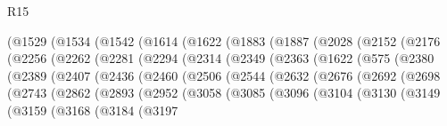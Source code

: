 \begin{lexlean}{R15}
\begin{coremodule}
{{{{{{{{{{{          (@1529
            (@1534
              (@1542
                (@1614
                  (@1622
                    (@1883
                      (@1887
                        (@2028
                          (@2152
                            (@2176
                              (@2256
                                (@2262
                                  (@2281
                                    (@2294
                                      (@2314
                                        (@2349
                                          (@2363
                                            (@1622
                                              (@575
                                                (@2380
                                                  (@2389
                                                    (@2407
                                                      (@2436
                                                        (@2460
                                                          (@2506
                                                            (@2544
                                                              (@2632
                                                                (@2676
                                                                  (@2692
                                                                    (@2698
                                                                      (@2743
                                                                        (@2862
                                                                          (@2893
                                                                            (@2952
                                                                              (@3058
                                                                                (@3085
                                                                                  (@3096
                                                                                    (@3104
                                                                                      (@3130
                                                                                        (@3149
                                                                                          (@3159
                                                                                            (@3168
                                                                                              (@3184
                                                                                                (@3197
}}}}}}}}}}}
\end{coremodule}
\end{lexlean}
